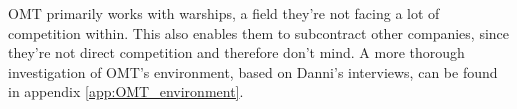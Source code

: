 OMT primarily works with warships, a field they're not facing a lot of competition within. 
This also enables them to subcontract other companies, since they're not direct competition and therefore don't mind.
A more thorough investigation of OMT's environment, based on Danni's interviews, can be found in appendix \ref{app:OMT_environment}.